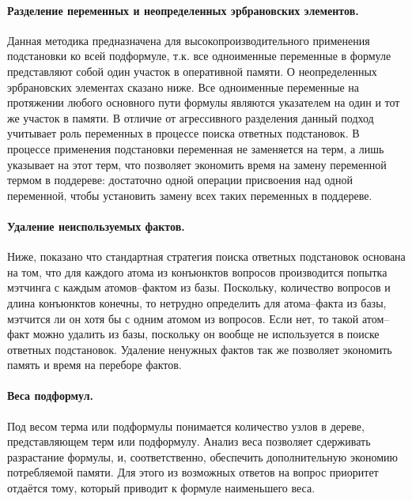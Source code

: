 \paragraph{Разделение переменных и неопределенных эрбрановских элементов.} Данная методика предназначена для высокопроизводительного применения подстановки ко всей подформуле, т.к. все одноименные переменные в формуле представляют собой один участок в оперативной памяти. О неопределенных эрбрановских элементах сказано ниже. Все одноименные переменные на протяжении любого основного пути формулы \cite{dissChe} являются указателем на один и тот же участок в памяти. В отличие от агрессивного разделения данный подход учитывает роль переменных в процессе поиска ответных подстановок. В процессе применения подстановки переменная не заменяется на терм, а лишь указывает на этот терм, что позволяет экономить время на замену переменной термом в поддереве: достаточно одной операции присвоения над одной переменной, чтобы установить замену всех таких переменных в поддереве.


\paragraph{Удаление неиспользуемых фактов.} Ниже, показано что стандартная стратегия поиска ответных подстановок основана на том, что для каждого атома из конъюнктов вопросов производится попытка мэтчинга с каждым атомов--фактом из базы. Поскольку, количество вопросов и длина конъюнктов конечны, то нетрудно определить для атома--факта из базы, мэтчится ли он хотя бы с одним атомом из вопросов. Если нет, то такой атом--факт можно удалить из базы, поскольку он вообще не используется в поиске ответных подстановок. Удаление ненужных фактов так же позволяет экономить память и время на переборе фактов.

\paragraph{Веса подформул.} Под весом терма или подформулы понимается количество узлов в дереве, представляющем терм или подформулу. Анализ веса позволяет сдерживать разрастание формулы, и, соответственно, обеспечить дополнительную экономию потребляемой памяти. Для этого из возможных ответов на вопрос приоритет отдаётся тому, который приводит к формуле наименьшего веса.


